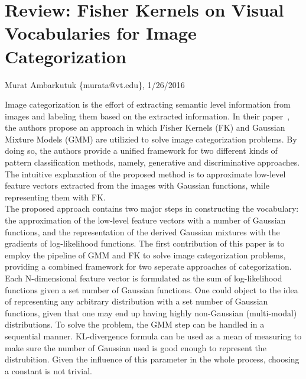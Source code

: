 \documentclass[11pt]{article}
\begin{document}
\thispagestyle{empty}
\section{Review: Fisher Kernels on Visual Vocabularies for Image Categorization}
\begin{flushright}
	\small{Murat Ambarkutuk \{murata@vt.edu\}, 1/26/2016}
\end{flushright}
\indent Image categorization is the effort of extracting semantic level information from images and labeling them based on the extracted information.
In their paper~\cite{perronnin2007fisher}, the authors propose an approach in which Fisher Kernels (FK) and Gaussian Mixture Models (GMM) are utilizied to solve image categorization problems.
By doing so, the authors provide a unified framework for two different kinds of pattern classification methods, namely, generative and discriminative approaches.
The intuitive explanation of the proposed method is to approximate low-level feature vectors extracted from the images with Gaussian functions, while representing them with FK.\@ \\
\indent The proposed approach contains two major steps in constructing the vocabulary: the approximation of the low-level feature vectors with a number of Gaussian functions, and the representation of the derived Gaussian mixtures with the gradients of log-likelihood functions.
The first contribution of this paper is to employ the pipeline of GMM and FK to solve image categorization problems, providing a combined framework for two seperate approaches of categorization.
Each N-dimensional feature vector is formulated as the sum of log-likelihood functions given a set number of Gaussian functions.
One could object to the idea of representing any arbitrary distribution with a set number of Gaussian functions, given that one may end up having highly non-Gaussian (multi-modal) distributions.
To solve the problem, the GMM step can be handled in a sequential manner. KL-divergence formula can be used as a mean of measuring to make sure the number of Gaussian used is good enough to represent the distrubition.
Given the influence of this parameter in the whole process, choosing a constant is not trivial.
\end{document}
